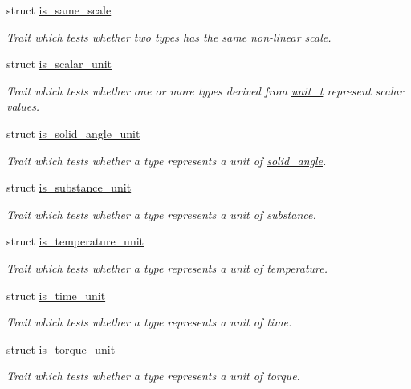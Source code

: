 \begin{DoxyCompactItemize}
struct \hyperlink{structunits_1_1traits_1_1is__same__scale}{is\+\_\+same\+\_\+scale}
\begin{DoxyCompactList}\small\item\em Trait which tests whether two types has the same non-\/linear scale. \end{DoxyCompactList}\item 
struct \hyperlink{structunits_1_1traits_1_1is__scalar__unit}{is\+\_\+scalar\+\_\+unit}
\begin{DoxyCompactList}\small\item\em Trait which tests whether one or more types derived from {\ttfamily \hyperlink{classunits_1_1unit__t}{unit\+\_\+t}} represent scalar values. \end{DoxyCompactList}\item 
struct \hyperlink{structunits_1_1traits_1_1is__solid__angle__unit}{is\+\_\+solid\+\_\+angle\+\_\+unit}
\begin{DoxyCompactList}\small\item\em Trait which tests whether a type represents a unit of \hyperlink{namespaceunits_1_1solid__angle}{solid\+\_\+angle}. \end{DoxyCompactList}\item 
struct \hyperlink{structunits_1_1traits_1_1is__substance__unit}{is\+\_\+substance\+\_\+unit}
\begin{DoxyCompactList}\small\item\em Trait which tests whether a type represents a unit of substance. \end{DoxyCompactList}\item 
struct \hyperlink{structunits_1_1traits_1_1is__temperature__unit}{is\+\_\+temperature\+\_\+unit}
\begin{DoxyCompactList}\small\item\em Trait which tests whether a type represents a unit of temperature. \end{DoxyCompactList}\item 
struct \hyperlink{structunits_1_1traits_1_1is__time__unit}{is\+\_\+time\+\_\+unit}
\begin{DoxyCompactList}\small\item\em Trait which tests whether a type represents a unit of time. \end{DoxyCompactList}\item 
struct \hyperlink{structunits_1_1traits_1_1is__torque__unit}{is\+\_\+torque\+\_\+unit}
\begin{DoxyCompactList}\small\item\em Trait which tests whether a type represents a unit of torque. \end{DoxyCompactList}\item 

\end{DoxyCompactItemize}
